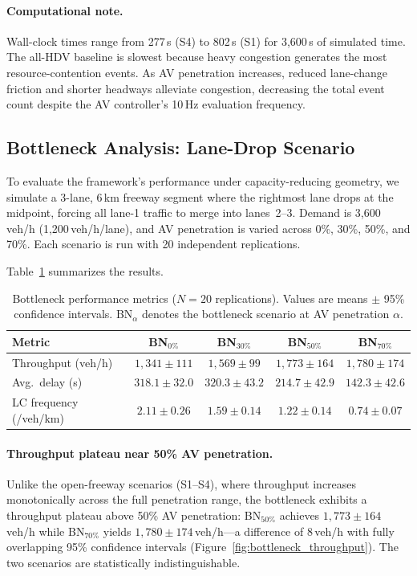 \documentclass[review,authoryear]{elsarticle}
\begin{document}
\paragraph{Computational note.} Wall-clock times range from 277\,s (S4) to 802\,s (S1) for 3{,}600\,s of simulated time. The all-HDV baseline is slowest because heavy congestion generates the most resource-contention events. As AV penetration increases, reduced lane-change friction and shorter headways alleviate congestion, decreasing the total event count despite the AV controller's 10\,Hz evaluation frequency.



\subsection{Bottleneck Analysis: Lane-Drop Scenario}
\label{sec:exp_bottleneck}

To evaluate the framework's performance under capacity-reducing geometry, we simulate a 3-lane, 6\,km freeway segment where the rightmost lane drops at the midpoint, forcing all lane-1 traffic to merge into lanes~2--3. Demand is 3{,}600\,veh/h (1{,}200\,veh/h/lane), and AV penetration is varied across 0\%, 30\%, 50\%, and 70\%. Each scenario is run with 20 independent replications.

Table~\ref{tab:results_bottleneck} summarizes the results.

\begin{table}[ht]
\centering
\caption{Bottleneck performance metrics ($N = 20$ replications). Values are means $\pm$ 95\% confidence intervals. BN$_\alpha$ denotes the bottleneck scenario at AV penetration $\alpha$.}
\label{tab:results_bottleneck}
\begin{tabular}{@{}lcccc@{}}
\toprule
Metric & BN$_{0\%}$ & BN$_{30\%}$ & BN$_{50\%}$ & BN$_{70\%}$ \\
\midrule
Throughput (veh/h) & $1{,}341 \pm 111$ & $1{,}569 \pm 99$ & $1{,}773 \pm 164$ & $1{,}780 \pm 174$ \\
Avg.\ delay (s) & $318.1 \pm 32.0$ & $320.3 \pm 43.2$ & $214.7 \pm 42.9$ & $142.3 \pm 42.6$ \\
LC frequency (/veh/km) & $2.11 \pm 0.26$ & $1.59 \pm 0.14$ & $1.22 \pm 0.14$ & $0.74 \pm 0.07$ \\
\bottomrule
\end{tabular}
\end{table}

\paragraph{Throughput plateau near 50\% AV penetration.}
Unlike the open-freeway scenarios (S1--S4), where throughput increases monotonically across the full penetration range, the bottleneck exhibits a throughput plateau above 50\% AV penetration: BN$_{50\%}$ achieves $1{,}773 \pm 164$\,veh/h while BN$_{70\%}$ yields $1{,}780 \pm 174$\,veh/h---a difference of 8\,veh/h with fully overlapping 95\% confidence intervals (Figure~\ref{fig:bottleneck_throughput}). The two scenarios are statistically indistinguishable.
\end{document}
